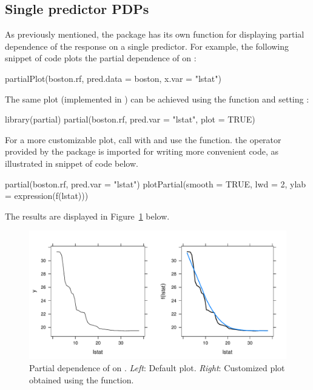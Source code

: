 \subsection{Single predictor PDPs}

As previously mentioned, the  package has its own  function for displaying partial dependence of the response on a single predictor. For example, the following snippet of code plots the partial dependence of  on :
\begin{example}
partialPlot(boston.rf, pred.data = boston, x.var = "lstat")
\end{example}
The same plot (implemented in ) can be achieved using the  function and setting :
\begin{example}
library(partial)
partial(boston.rf, pred.var = "lstat", plot = TRUE)
\end{example}
For a more customizable plot, call  with  and use the  function.  the  operator provided by the  package \citep{magrittr-pkg} is imported for writing more convenient code, as illustrated in snippet of code below.
\begin{example}
partial(boston.rf, pred.var = "lstat") %
  plotPartial(smooth = TRUE, lwd = 2, ylab = expression(f(lstat)))
\end{example}
The results are displayed in Figure~\ref{fig:pd_lstat} below.

\begin{figure}[htbp]
  \centering
  \includegraphics[width=1.0\linewidth]{pd_lstat}
  \caption{Partial dependence of  on . \textit{Left}: Default plot. \textit{Right}: Customized plot obtained using the  function.}
  \label{fig:pd_lstat}
\end{figure}

